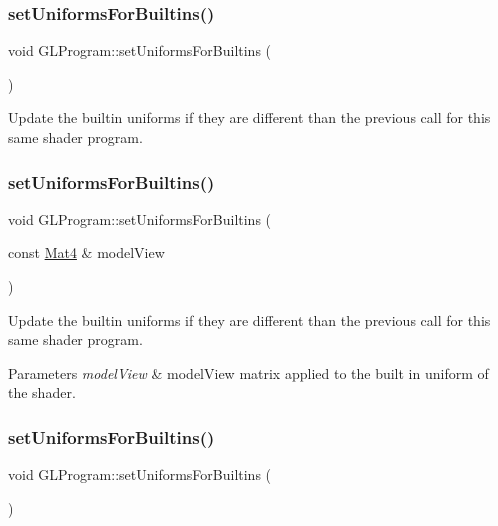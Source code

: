 \subsubsection{\texorpdfstring{set\+Uniforms\+For\+Builtins()}{setUniformsForBuiltins()}\hspace{0.1cm}{\footnotesize\ttfamily [2/4]}}
{\footnotesize\ttfamily void G\+L\+Program\+::set\+Uniforms\+For\+Builtins (\begin{DoxyParamCaption}{ }\end{DoxyParamCaption})}

Update the builtin uniforms if they are different than the previous call for this same shader program. \mbox{\label{classGLProgram_a62b6c142c96d7286e5d465e0163947ba}} 
\subsubsection{\texorpdfstring{set\+Uniforms\+For\+Builtins()}{setUniformsForBuiltins()}\hspace{0.1cm}{\footnotesize\ttfamily [3/4]}}
{\footnotesize\ttfamily void G\+L\+Program\+::set\+Uniforms\+For\+Builtins (\begin{DoxyParamCaption}\item[{const \hyperlink{classMat4}{Mat4} \&}]{model\+View }\end{DoxyParamCaption})}

Update the builtin uniforms if they are different than the previous call for this same shader program. 
\begin{DoxyParams}{Parameters}
{\em model\+View} & model\+View matrix applied to the built in uniform of the shader. \\
\hline
\end{DoxyParams}
\mbox{\label{classGLProgram_af8f90606d2bffb6418a67195cb9ddc7d}} 
\subsubsection{\texorpdfstring{set\+Uniforms\+For\+Builtins()}{setUniformsForBuiltins()}\hspace{0.1cm}{\footnotesize\ttfamily [4/4]}}
{\footnotesize\ttfamily void G\+L\+Program\+::set\+Uniforms\+For\+Builtins (\begin{DoxyParamCaption}{ }\end{DoxyParamCaption})}

